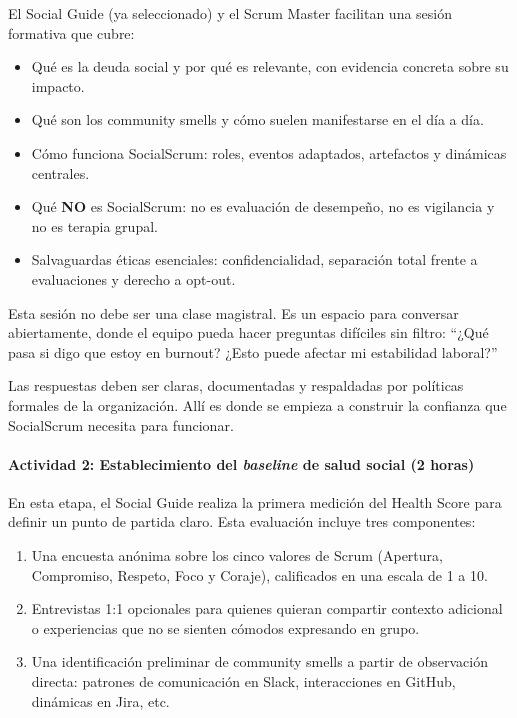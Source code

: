 El Social Guide (ya seleccionado) y el Scrum Master facilitan una sesión formativa que cubre:

\begin{itemize}
    \item Qué es la deuda social y por qué es relevante, con evidencia concreta sobre su impacto.
    \item Qué son los community smells y cómo suelen manifestarse en el día a día.
    \item Cómo funciona SocialScrum: roles, eventos adaptados, artefactos y dinámicas centrales.
    \item Qué \textbf{NO} es SocialScrum: no es evaluación de desempeño, no es vigilancia y no es terapia grupal.
    \item Salvaguardas éticas esenciales: confidencialidad, separación total frente a evaluaciones y derecho a opt-out.
\end{itemize}

Esta sesión no debe ser una clase magistral. Es un espacio para conversar abiertamente, donde el equipo pueda hacer preguntas difíciles sin filtro:
``¿Qué pasa si digo que estoy en burnout? ¿Esto puede afectar mi estabilidad laboral?''

Las respuestas deben ser claras, documentadas y respaldadas por políticas formales de la organización. Allí es donde se empieza a construir la confianza que SocialScrum necesita para funcionar.

\paragraph{Actividad 2: Establecimiento del \textit{baseline} de salud social (2 horas)}

En esta etapa, el Social Guide realiza la primera medición del Health Score para definir un punto de partida claro. Esta evaluación incluye tres componentes:

\begin{enumerate}
    \item Una encuesta anónima sobre los cinco valores de Scrum (Apertura, Compromiso, Respeto, Foco y Coraje), calificados en una escala de 1 a 10.
    \item Entrevistas 1:1 opcionales para quienes quieran compartir contexto adicional o experiencias que no se sienten cómodos expresando en grupo.
    \item Una identificación preliminar de community smells a partir de observación directa: patrones de comunicación en Slack, interacciones en GitHub, dinámicas en Jira, etc.
\end{enumerate}

